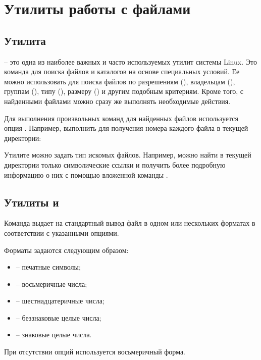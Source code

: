 \section{Утилиты работы с файлами}

\subsection{Утилита }

 -- это одна из наиболее важных и часто используемых утилит системы Linux. Это команда для поиска файлов и каталогов на основе специальных условий. Ее можно использовать для поиска файлов по разрешениям (), владельцам (), группам (), типу (), размеру () и другим подобным критериям. Кроме того, с найденными файлами можно сразу же выполнять необходимые действия.

Для выполнения произвольных команд для найденных файлов используется опция . Например, выполнить  для получения номера  каждого файла в текущей директории:


Утилите  можно задать тип искомых файлов. Например, можно найти в текущей директории только символические ссылки и получить более подробную информацию о них с помощью вложенной команды .


\subsection{Утилиты  и }

Команда  выдает на стандартный вывод файл в одном или нескольких форматах в соответствии с указанными опциями. 

Форматы задаются следующим образом:
\begin{itemize}
	\item {} -- печатные символы;
	\item {} -- восьмеричные числа;
	\item {} -- шестнадцатеричные числа;
	\item {} -- беззнаковые целые числа;
	\item {} -- знаковые целые числа.
\end{itemize}

При отсутствии опций используется восьмеричный форма.


